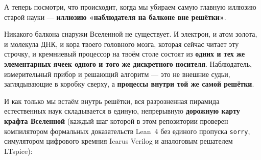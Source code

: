 А теперь посмотри, что происходит, когда мы убираем самую главную иллюзию старой науки --- \textbf{иллюзию «наблюдателя на балконе вне решётки»}.

Никакого балкона снаружи Вселенной не существует. И электрон, и атом золота, и молекула ДНК, и кора твоего головного мозга, которая сейчас читает эту строчку, и кремниевый процессор на твоём столе состоят из \textbf{одних и тех же элементарных ячеек одного и того же дискретного носителя}. Наблюдатель, измерительный прибор и решающий алгоритм --- это не внешние судьи, заглядывающие в коробку сверху, а \textbf{процессы внутри той же самой решётки}.

И как только мы встаём внутрь решётки, вся разрозненная пирамида естественных наук складывается в единую, непрерывную \textbf{дорожную карту крафта Вселенной} (каждый шаг которой в этом репозитории проверен компилятором формальных доказательств Lean~4 без единого пропуска \texttt{sorry}, симулятором цифрового кремния Icarus Verilog и аналоговым решателем LTspice):

